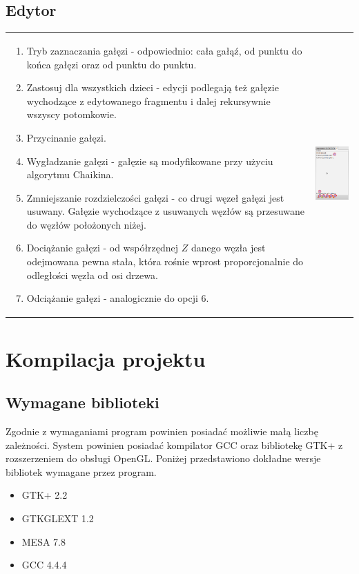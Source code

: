 \subsection{Edytor}
\begin{threeparttable}
\begin{tabular}{lr}
\parbox[c]{95mm}{
\begin{enumerate}
	\item {Tryb zaznaczania gałęzi - odpowiednio: cała gałąź, od punktu do końca gałęzi oraz od punktu do punktu.}
	\item {Zastosuj dla wszystkich dzieci - edycji podlegają też gałęzie wychodzące z edytowanego fragmentu i dalej rekursywnie wszyscy potomkowie.}
	\item {Przycinanie gałęzi.}
	\item {Wygładzanie gałęzi - gałęzie są modyfikowane przy użyciu algorytmu Chaikina.}
	\item {Zmniejszanie rozdzielczości gałęzi - co drugi węzeł gałęzi jest usuwany. Gałęzie wychodzące z usuwanych węzłów są przesuwane do węzłów położonych niżej.}
	\item {Dociążanie gałęzi - od współrzędnej $Z$ danego węzła jest odejmowana pewna stała, która rośnie wprost proporcjonalnie do odległości węzła od osi drzewa.}
	\item {Odciążanie gałęzi - analogicznie do opcji 6.}
\end{enumerate}
} &
\parbox[c]{35mm}{
\includegraphics[width=35mm]{images/gui/editor_panel.png}
}\\
\end{tabular}
\end{threeparttable}
\newpage
\section{Kompilacja projektu}
\subsection{Wymagane biblioteki}
Zgodnie z wymaganiami program powinien posiadać możliwie małą liczbę zależności. System powinien posiadać kompilator GCC oraz bibliotekę GTK+ z rozszerzeniem do obsługi OpenGL.
Poniżej przedstawiono dokładne wersje bibliotek wymagane przez program.
\begin{itemize}
\item GTK+ 2.2
\item GTKGLEXT 1.2
\item MESA 7.8
\item GCC 4.4.4
\end{itemize}
